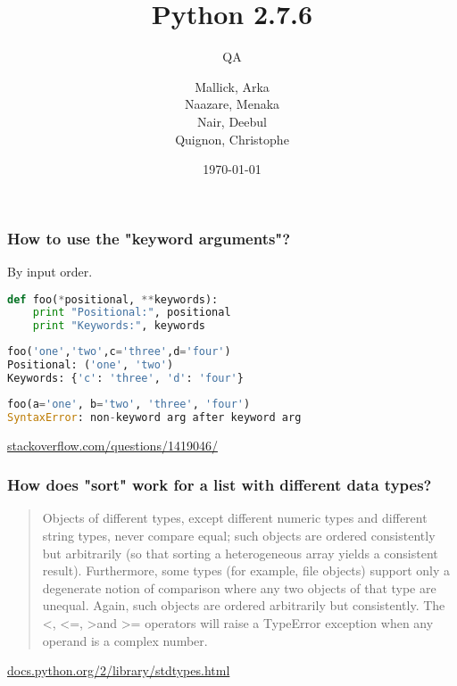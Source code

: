\documentclass{beamer}
\begin{document}
\title{Python 2.7.6}
\subtitle{QA}
\author{
  Mallick, Arka\\
  Naazare, Menaka \\
  Nair, Deebul\\
  Quignon, Christophe \\
} 
\date{\today}

\begin{frame}
\titlepage
\end{frame}


\begin{frame}[fragile]
\frametitle{How to use the "keyword arguments"?}
By input order.
\begin{lstlisting}[language=Python]
def foo(*positional, **keywords):
    print "Positional:", positional
    print "Keywords:", keywords
\end{lstlisting}

\begin{lstlisting}[language=Python]
foo('one','two',c='three',d='four')
Positional: ('one', 'two')
Keywords: {'c': 'three', 'd': 'four'}
\end{lstlisting}
\begin{lstlisting}[language=Python]
 foo(a='one', b='two', 'three', 'four')
SyntaxError: non-keyword arg after keyword arg
\end{lstlisting}
\hbox{}
\hbox{}
\scriptsize
\hfill{}\href{http://stackoverflow.com/questions/1419046/}{stackoverflow.com/questions/1419046/}

\end{frame}


\begin{frame}[fragile]
\frametitle{How does "sort" work for a list with different data types?}
\begin{quote}
Objects of different types, except different numeric types and different string types, never compare equal; such objects are ordered consistently but arbitrarily (so that sorting a heterogeneous array yields a consistent result). Furthermore, some types (for example, file objects) support only a degenerate notion of comparison where any two objects of that type are unequal. Again, such objects are ordered arbitrarily but consistently. The \textless, \textless=, \textgreater and \textgreater= operators will raise a TypeError exception when any operand is a complex number.
\end{quote}
\href{https://docs.python.org/2/library/stdtypes.html}{docs.python.org/2/library/stdtypes.html}
\end{frame}
\end{document}
